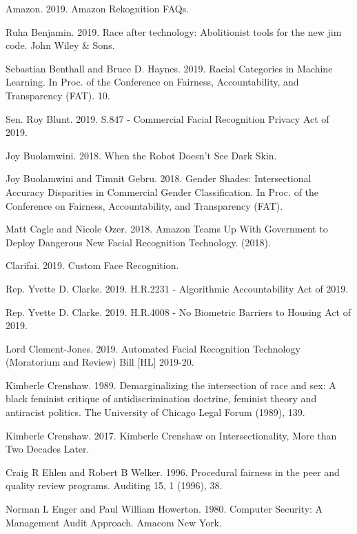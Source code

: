 \documentclass[11pt, a4paper]{article}
\begin{document}
\newpage
\begin{thebibliography}{9}
    Amazon. 2019. Amazon Rekognition FAQs.
    
    Ruha Benjamin. 2019. Race after technology: Abolitionist tools for the new jim code.
    John Wiley \& Sons.
    
    Sebastian Benthall and Bruce D. Haynes. 2019. Racial Categories in Machine
    Learning. In Proc. of the Conference on Fairness, Accountability, and Transparency (FAT). 10.
    
    Sen. Roy Blunt. 2019. S.847 - Commercial Facial Recognition Privacy Act of 2019.
    
    Joy Buolamwini. 2018. When the Robot Doesn’t See Dark Skin.
    
    Joy Buolamwini and Timnit Gebru. 2018. Gender Shades: Intersectional Accuracy
    Disparities in Commercial Gender Classification. In Proc. of the Conference on
    Fairness, Accountability, and Transparency (FAT).
    
    Matt Cagle and Nicole Ozer. 2018. Amazon Teams Up With Government to
    Deploy Dangerous New Facial Recognition Technology. (2018).
    
    Clarifai. 2019. Custom Face Recognition.
    
    Rep. Yvette D. Clarke. 2019. H.R.2231 - Algorithmic Accountability Act of 2019.
    
    Rep. Yvette D. Clarke. 2019. H.R.4008 - No Biometric Barriers to Housing Act
    of 2019.
    
    Lord Clement-Jones. 2019. Automated Facial Recognition Technology (Moratorium and Review) Bill [HL] 2019-20.
    
    Kimberle Crenshaw. 1989. Demarginalizing the intersection of race and sex:
    A black feminist critique of antidiscrimination doctrine, feminist theory and
    antiracist politics. The University of Chicago Legal Forum (1989), 139.
    
    Kimberle Crenshaw. 2017. Kimberle Crenshaw on Intersectionality, More than Two Decades Later.
    
    Craig R Ehlen and Robert B Welker. 1996. Procedural fairness in the peer and quality review programs.
    Auditing 15, 1 (1996), 38.

    Norman L Enger and Paul William Howerton. 1980.
    Computer Security: A Management Audit Approach. Amacom New York.
    

\end{thebibliography}
\end{document}
